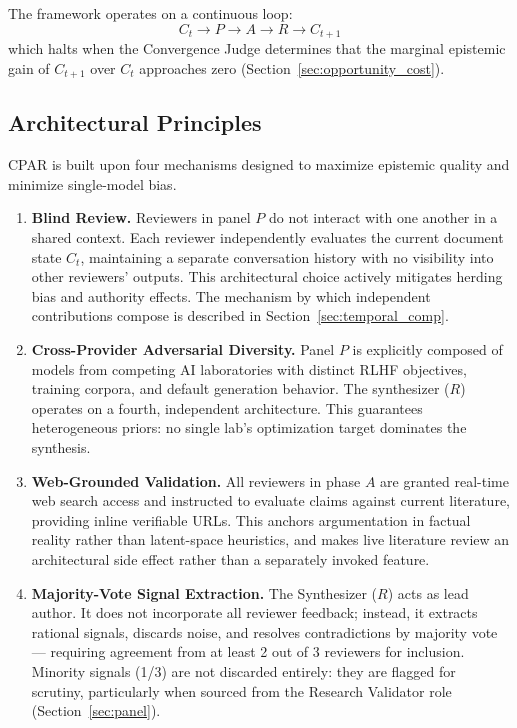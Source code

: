 \documentclass[11pt, a4paper]{article}
\begin{document}
The framework operates on a continuous loop:
\begin{equation}
C_t \rightarrow P \rightarrow A \rightarrow R \rightarrow C_{t+1}
\end{equation}
which halts when the Convergence Judge determines that the marginal epistemic gain of $C_{t+1}$ over $C_t$ approaches zero (Section~\ref{sec:opportunity_cost}).

\subsection{Architectural Principles}

CPAR is built upon four mechanisms designed to maximize epistemic quality and minimize single-model bias.

\begin{enumerate}
    \item \textbf{Blind Review.} Reviewers in panel $P$ do not interact with one another in a shared context. Each reviewer independently evaluates the current document state $C_t$, maintaining a separate conversation history with no visibility into other reviewers' outputs. This architectural choice actively mitigates herding bias and authority effects. The mechanism by which independent contributions compose is described in Section~\ref{sec:temporal_comp}.

    \item \textbf{Cross-Provider Adversarial Diversity.} Panel $P$ is explicitly composed of models from competing AI laboratories with distinct RLHF objectives, training corpora, and default generation behavior. The synthesizer ($R$) operates on a fourth, independent architecture. This guarantees heterogeneous priors: no single lab's optimization target dominates the synthesis.

    \item \textbf{Web-Grounded Validation.} All reviewers in phase $A$ are granted real-time web search access and instructed to evaluate claims against current literature, providing inline verifiable URLs. This anchors argumentation in factual reality rather than latent-space heuristics, and makes live literature review an architectural side effect rather than a separately invoked feature.

    \item \textbf{Majority-Vote Signal Extraction.} The Synthesizer ($R$) acts as lead author. It does not incorporate all reviewer feedback; instead, it extracts rational signals, discards noise, and resolves contradictions by majority vote --- requiring agreement from at least 2 out of 3 reviewers for inclusion. Minority signals (1/3) are not discarded entirely: they are flagged for scrutiny, particularly when sourced from the Research Validator role (Section~\ref{sec:panel}).
\end{enumerate}
\end{document}
